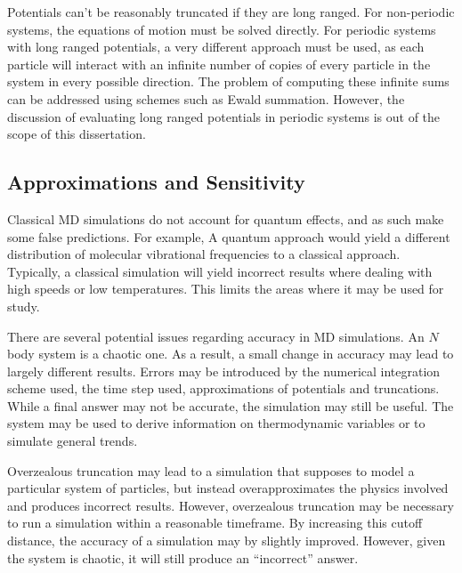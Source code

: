 %
Potentials can't be reasonably truncated if they are long ranged.
%
For non-periodic systems, the equations of motion must be solved directly.
%
For periodic systems with long ranged potentials,
a very different approach must be used,
as each particle will interact with
an infinite number of copies of
every particle in the system in every possible direction.
%
The problem of computing these infinite sums can be addressed using
schemes such as Ewald summation.
%
However, the discussion of evaluating long ranged potentials in periodic systems
is out of the scope of this dissertation.


\subsection{Approximations and Sensitivity}

Classical MD simulations do not account for quantum effects,
and as such make some false predictions.
%
For example, A quantum approach would yield
a different distribution of
molecular vibrational frequencies to a classical approach.
%
Typically, a classical simulation will yield incorrect results
where dealing with high speeds or low temperatures.
%
This limits the areas where it may be used for study.

There are several potential issues regarding accuracy in MD simulations.
%
An $N$ body system is a chaotic one.
%
As a result, a small change in accuracy may lead to
largely different results.
%
Errors may be introduced by
the numerical integration scheme used,
the time step used,
approximations of potentials
and truncations.
%
While a final answer may not be accurate,
the simulation may still be useful.
%
The system may be used to derive information on
thermodynamic variables or to simulate general trends.

Overzealous truncation may lead to a simulation that supposes to
model a particular system of particles, but instead overapproximates
the physics involved and produces incorrect results.
%
However, overzealous truncation may be necessary to run a simulation
within a reasonable timeframe.
%
By increasing this cutoff distance, the accuracy of a simulation may
by slightly improved.
%
However, given the system is chaotic, it will
still produce an ``incorrect'' answer.
